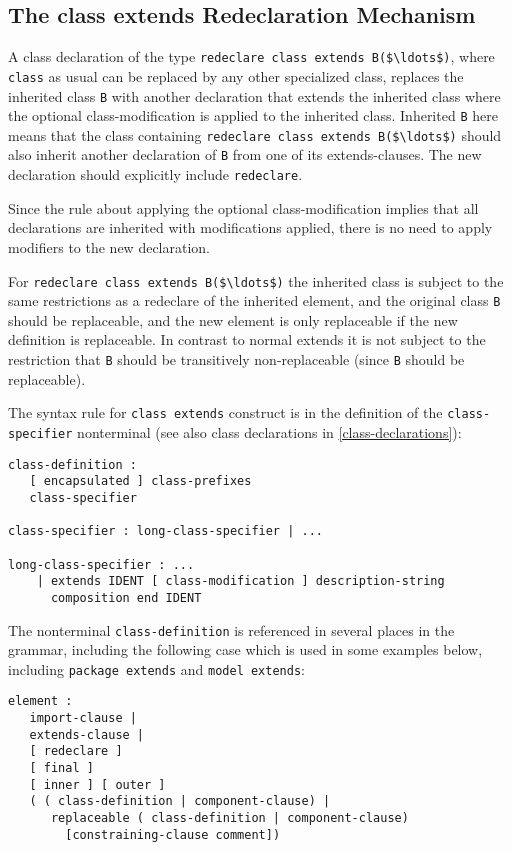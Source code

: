 \subsection{The class extends Redeclaration Mechanism}\label{the-class-extends-redeclaration-mechanism}

A class declaration of the type \lstinline!redeclare class extends B($\ldots$)!, where \lstinline!class! as usual can be replaced by any other specialized class, replaces the inherited class \lstinline!B! with another declaration that extends the inherited class where the optional class-modification is applied to the inherited class.  Inherited \lstinline!B! here means that the class containing \lstinline!redeclare class extends B($\ldots$)! should also inherit another declaration of \lstinline!B! from one of its extends-clauses.  The new declaration should explicitly include \lstinline!redeclare!.

\begin{nonnormative}
Since the rule about applying the optional class-modification implies that all declarations are inherited with modifications applied, there is no need
to apply modifiers to the new declaration.
\end{nonnormative}

For \lstinline!redeclare class extends B($\ldots$)! the inherited class is subject
to the same restrictions as a redeclare of the inherited element, and
the original class \lstinline!B! should be replaceable, and the new element is only
replaceable if the new definition is replaceable. In contrast to normal
extends it is not subject to the restriction that \lstinline!B! should be
transitively non-replaceable (since \lstinline!B! should be replaceable).

The syntax rule for \lstinline!class extends! construct is in the definition of the
\lstinline!class-specifier! nonterminal (see also class declarations in \cref{class-declarations}):
\begin{lstlisting}[language=grammar]
class-definition :
   [ encapsulated ] class-prefixes
   class-specifier

class-specifier : long-class-specifier | ...

long-class-specifier : ...
    | extends IDENT [ class-modification ] description-string
      composition end IDENT
\end{lstlisting}
The nonterminal \lstinline!class-definition! is referenced in several places in the
grammar, including the following case which is used in some examples
below, including \lstinline!package extends! and \lstinline!model extends!:
\begin{lstlisting}[language=grammar]
element :
   import-clause |
   extends-clause |
   [ redeclare ]
   [ final ]
   [ inner ] [ outer ]
   ( ( class-definition | component-clause) |
      replaceable ( class-definition | component-clause)
        [constraining-clause comment])
\end{lstlisting}

